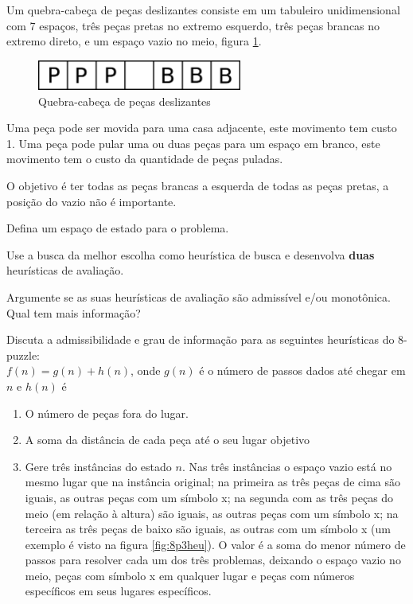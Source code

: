 \documentclass[12pt]{exam}
\begin{document}
\break

\begin{questions}


\item Um quebra-cabeça de peças deslizantes consiste em um tabuleiro unidimensional com 7 espaços, três peças pretas no extremo esquerdo, três peças brancas no extremo direto, e um espaço vazio no meio, figura \ref{fig:bp}.

\begin{figure}[h]
    \centering
    \includegraphics[width=0.60\textwidth]{bp}
    \caption{Quebra-cabeça de peças deslizantes}
    \label{fig:bp}
\end{figure}

Uma peça pode ser movida para uma casa adjacente, este movimento tem custo 1. Uma peça pode pular uma ou duas peças para um espaço em branco, este movimento tem o custo da quantidade de peças puladas.

O objetivo é ter todas as peças brancas a esquerda de todas as peças pretas, a posição do vazio não é importante.

Defina um espaço de estado para o problema.

Use a busca da melhor escolha como heurística de busca e desenvolva \textbf{duas} heurísticas de avaliação.

Argumente se as suas heurísticas de avaliação são admissível e/ou monotônica. Qual tem mais informação?


\item Discuta a admissibilidade
e grau de informação para as seguintes heurísticas do 8-puzzle:\\
$f(n) = g(n)+h(n)$, onde $g(n)$ é o número de passos dados até chegar em $n$ e $h(n)$ é

\begin{enumerate}
\item O número de peças fora do lugar.
\item A soma da distância de cada peça até o seu lugar objetivo
\item Gere três instâncias do estado $n$. Nas três instâncias o espaço vazio está no mesmo lugar que na instância original; na primeira as três peças de cima são iguais, as outras peças com um símbolo x; na segunda com as três peças do meio (em relação à altura) são iguais, as outras peças com um símbolo x; na terceira as três peças de baixo são iguais, as outras com um símbolo x (um exemplo é visto na figura \ref{fig:8p3heu}). O valor é a soma do menor número de passos para resolver cada um dos três problemas, deixando o espaço vazio no meio, peças com símbolo x em qualquer lugar e peças com números específicos em seus lugares específicos.
\end{enumerate}


\end{questions}
\end{document}
